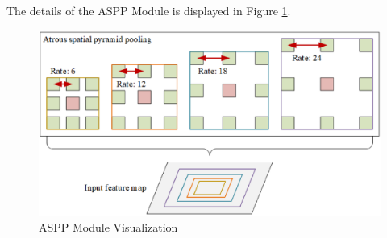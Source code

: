 \documentclass{report}
\begin{document}
The details of the ASPP Module is displayed in Figure \ref{fig:ASPP_Module}.
\begin{figure} [H]
    \centering
    \includegraphics[width=1\linewidth]{Images_from_other_sources/ASPP_Module.png}
    \caption{ASPP Module Visualization \parencites[p.~3775]{OrfanidisEtAlDeepNeuralNetworkOilSpillSemanticSegmentationSarImages2018}}
    \label{fig:ASPP_Module}
\end{figure}
\par
\end{document}
